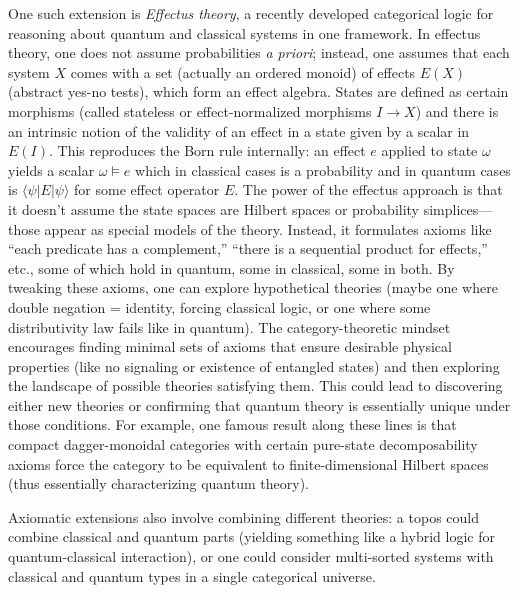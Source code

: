 \documentclass[12pt]{article}
\begin{document}
One such extension is \emph{Effectus theory}, a recently developed categorical logic for reasoning about quantum and classical systems in one framework. In effectus theory, one does not assume probabilities \emph{a priori}; instead, one assumes that each system $X$ comes with a set (actually an ordered monoid) of effects $E(X)$ (abstract yes-no tests), which form an effect algebra. States are defined as certain morphisms (called stateless or effect-normalized morphisms $I \to X$) and there is an intrinsic notion of the validity of an effect in a state given by a scalar in $E(I)$. This reproduces the Born rule internally: an effect $e$ applied to state $\omega$ yields a scalar $\omega \models e$ which in classical cases is a probability and in quantum cases is $\langle \psi \lvert E \lvert \psi \rangle$ for some effect operator $E$. The power of the effectus approach is that it doesn’t assume the state spaces are Hilbert spaces or probability simplices---those appear as special models of the theory. Instead, it formulates axioms like ``each predicate has a complement,'' ``there is a sequential product for effects,'' etc., some of which hold in quantum, some in classical, some in both. By tweaking these axioms, one can explore hypothetical theories (maybe one where double negation = identity, forcing classical logic, or one where some distributivity law fails like in quantum). The category-theoretic mindset encourages finding minimal sets of axioms that ensure desirable physical properties (like no signaling or existence of entangled states) and then exploring the landscape of possible theories satisfying them. This could lead to discovering either new theories or confirming that quantum theory is essentially unique under those conditions. For example, one famous result along these lines is that compact dagger-monoidal categories with certain pure-state decomposability axioms force the category to be equivalent to finite-dimensional Hilbert spaces (thus essentially characterizing quantum theory).

Axiomatic extensions also involve combining different theories: a topos could combine classical and quantum parts (yielding something like a hybrid logic for quantum-classical interaction), or one could consider multi-sorted systems with classical and quantum types in a single categorical universe.
\end{document}

